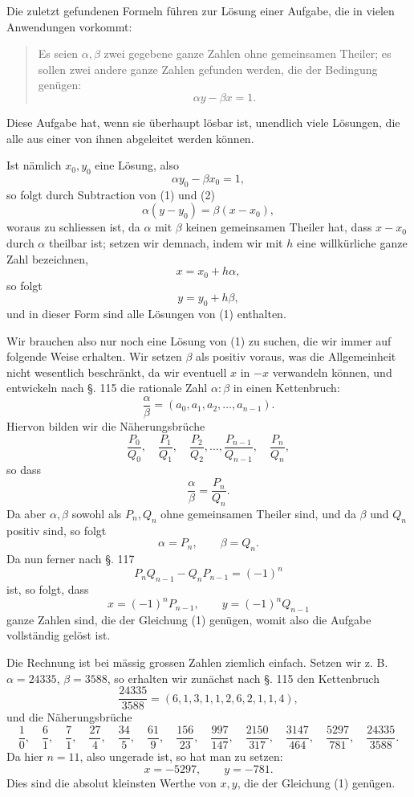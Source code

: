 \documentclass[11pt]{article}
\begin{document}
Die zuletzt gefundenen Formeln führen zur Lösung einer Aufgabe, die in vielen Anwendungen vorkommt:
\begin{quote}
Es seien $\alpha,\beta$ zwei gegebene ganze Zahlen ohne gemeinsamen Theiler; es sollen zwei andere ganze Zahlen gefunden werden, die der Bedingung genügen:
\[
\tag{1}        \alpha y-\beta x=1.
\]
\end{quote}
Diese Aufgabe hat, wenn sie überhaupt lösbar ist, unendlich viele Lösungen, die alle aus einer von ihnen abgeleitet werden können.

Ist nämlich $x_0,y_0$ eine Lösung, also
\[
\tag{2}        \alpha y_0-\beta x_0=1,
\]
so folgt durch Subtraction von (1) und (2)
\[
        \alpha(y-y_0)=\beta(x-x_0),
\]
woraus zu schliessen ist, da $\alpha$ mit $\beta$ keinen gemeinsamen Theiler hat, dass $x-x_0$ durch $\alpha$ theilbar ist; setzen wir demnach, indem wir mit $h$ eine willkürliche ganze Zahl bezeichnen,
\[
        x=x_0+h\alpha,
\]
so folgt
\[
        y=y_0+h\beta,
\]
und in dieser Form sind alle Lösungen von (1) enthalten.

Wir brauchen also nur noch eine Lösung von (1) zu suchen, die wir immer auf folgende Weise erhalten. Wir setzen $\beta$ als positiv voraus, was die Allgemeinheit nicht wesentlich beschränkt, da wir eventuell $x$ in $-x$ verwandeln können, und entwickeln nach §. 115 die rationale Zahl $\alpha:\beta$ in einen Kettenbruch:
\[
        \frac{\alpha}{\beta}=(a_0,a_1,a_2,\ldots,a_{n-1}).
\]
Hiervon bilden wir die Näherungsbrüche
\[
        \frac{P_0}{Q_0},\quad \frac{P_1}{Q_1},\quad \frac{P_2}{Q_2},\ldots,
        \frac{P_{n-1}}{Q_{n-1}},\quad \frac{P_n}{Q_n},
\]
so dass
\[
        \frac{\alpha}{\beta}=\frac{P_n}{Q_n}.
\]
Da aber $\alpha,\beta$ sowohl als $P_n,Q_n$ ohne gemeinsamen Theiler sind, und da $\beta$ und $Q_n$ positiv sind, so folgt
\[
        \alpha=P_n,
        \qquad
        \beta=Q_n.
\]
Da nun ferner nach §. 117
\[
        P_nQ_{n-1}-Q_nP_{n-1}=(-1)^n
\]
ist, so folgt, dass
\[
\tag{3}        x=(-1)^nP_{n-1},\qquad y=(-1)^nQ_{n-1}
\]
ganze Zahlen sind, die der Gleichung (1) genügen, womit also die Aufgabe vollständig gelöst ist.

Die Rechnung ist bei mässig grossen Zahlen ziemlich einfach. Setzen wir z. B. $\alpha=24335$, $\beta=3588$, so erhalten wir zunächst nach §. 115 den Kettenbruch
\[
        \frac{24335}{3588}=(6,1,3,1,1,2,6,2,1,1,4),
\]
und die Näherungsbrüche
\[
\frac10,\quad \frac61,\quad \frac71,\quad \frac{27}4,
\quad \frac{34}5,
\quad \frac{61}9,
\quad \frac{156}{23},
\quad \frac{997}{147},
\quad \frac{2150}{317},
\quad \frac{3147}{464},
\quad \frac{5297}{781},
\quad \frac{24335}{3588}.
\]
Da hier $n=11$, also ungerade ist, so hat man zu setzen:
\[
        x=-5297,
        \qquad
        y=-781.
\]
Dies sind die absolut kleinsten Werthe von $x,y$, die der Gleichung (1) genügen.
\end{document}
